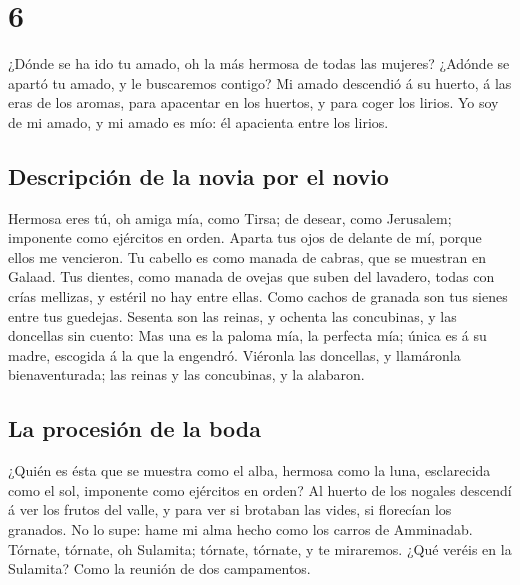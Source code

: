 \hypertarget{section-22-6}{%
\section{6}\label{section-22-6}}

 ¿Dónde se ha ido tu amado, oh la más hermosa de todas las
mujeres? ¿Adónde se apartó tu amado, y le buscaremos contigo?
 Mi amado descendió á su huerto, á las eras de los aromas,
para apacentar en los huertos, y para coger los lirios. 
Yo soy de mi amado, y mi amado es mío: él apacienta entre los lirios.

\hypertarget{descripciuxf3n-de-la-novia-por-el-novio-1}{%
\subsection{Descripción de la novia por el
novio}\label{descripciuxf3n-de-la-novia-por-el-novio-1}}

 Hermosa eres tú, oh amiga mía, como Tirsa; de desear,
como Jerusalem; imponente como ejércitos en orden.  Aparta
tus ojos de delante de mí, porque ellos me vencieron. Tu cabello es como
manada de cabras, que se muestran en Galaad.  Tus dientes,
como manada de ovejas que suben del lavadero, todas con crías mellizas,
y estéril no hay entre ellas.  Como cachos de granada son
tus sienes entre tus guedejas.  Sesenta son las reinas, y
ochenta las concubinas, y las doncellas sin cuento:  Mas
una es la paloma mía, la perfecta mía; única es á su madre, escogida á
la que la engendró. Viéronla las doncellas, y llamáronla bienaventurada;
las reinas y las concubinas, y la alabaron.

\hypertarget{la-procesiuxf3n-de-la-boda}{%
\subsection{La procesión de la boda}\label{la-procesiuxf3n-de-la-boda}}

 ¿Quién es ésta que se muestra como el alba, hermosa como
la luna, esclarecida como el sol, imponente como ejércitos en orden?
 Al huerto de los nogales descendí á ver los frutos del
valle, y para ver si brotaban las vides, si florecían los granados.
 No lo supe: hame mi alma hecho como los carros de
Amminadab.  Tórnate, tórnate, oh Sulamita; tórnate,
tórnate, y te miraremos. ¿Qué veréis en la Sulamita? Como la reunión de
dos campamentos.

